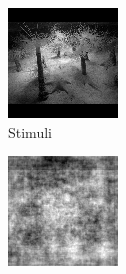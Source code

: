 \begin{figure}[H]
  \begin{subfigure}[t]{0.15\textwidth}
    \includegraphics[width=\linewidth]{img/one-trial/stimulus_4.png}
    \caption{Stimuli}
  \end{subfigure}
  \begin{subfigure}[t]{0.15\textwidth}
    \includegraphics[width=\linewidth]{img/one-trial/prediction_4_lr.png}

\end{subfigure}
\end{figure}
